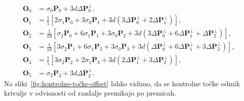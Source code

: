 \documentclass[isrm2, tisk]{fmfdelo}
\newcommand{\mycomment}[1]{\textbf{\textcolor{red}{#1}}}
\begin{document}
    \begin{align*}
        \mathbf{O}_0 &= \sigma_0\mathbf{P}_0+3d\Delta\mathbf{P}_0^{\perp},  \\
        \mathbf{O}_1 &= \frac{1}{5} \left[ 2\sigma_1\mathbf{P}_0+ 3\sigma_0\mathbf{P}_1 + 3d(3\Delta\mathbf{P}_0^{\perp} + 2\Delta\mathbf{P}_1^{\perp})\right], \\
        \mathbf{O}_2 &= \frac{1}{10} \left[\sigma_2\mathbf{P}_0+ 6\sigma_1\mathbf{P}_1 + 3\sigma_0\mathbf{P}_2 + 3d(3\Delta\mathbf{P}_0^{\perp} + 6\Delta\mathbf{P}_1^{\perp}+\Delta\mathbf{P}_2^{\perp})\right], \\
        \mathbf{O}_3 &= \frac{1}{10} \left[3\sigma_2\mathbf{P}_1+ 6\sigma_1\mathbf{P}_2 + 3\sigma_0\mathbf{P}_3 + 3d(\Delta\mathbf{P}_0^{\perp} + 6\Delta\mathbf{P}_1^{\perp}+3\Delta\mathbf{P}_2^{\perp})\right], \\
        \mathbf{O}_4 &= \frac{1}{5} \left[3\sigma_2\mathbf{P}_2+ 2\sigma_1\mathbf{P}_3 + 3d(2\Delta\mathbf{P}_1^{\perp} + 3\Delta\mathbf{P}_2^{\perp})\right], \\
        \mathbf{O}_5 &= \sigma_2\mathbf{P}_3+3d\Delta\mathbf{P}_2^{\perp}.
    \end{align*}
    Na sliki~\ref{fig:kontrolne-točke-offset} lahko vidimo, da se kontrolne točke odmik krivulje v odvisnosti od razdalje premikajo po premicah.
\end{document}
